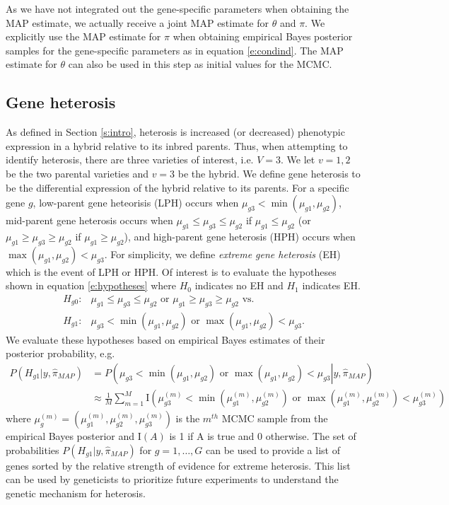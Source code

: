 \documentclass[useAMS,usenatbib,referee]{biom}
\begin{document}
As we have not integrated out the gene-specific parameters when obtaining the MAP estimate, we actually receive a joint MAP estimate for $\theta$ and $\pi$. We explicitly use the MAP estimate for $\pi$ when obtaining empirical Bayes posterior samples for the gene-specific parameters as in equation \eqref{e:condind}. The MAP estimate for $\theta$ can also be used in this step as initial values for the MCMC. 

\subsection{Gene heterosis}
\label{s:gene_heterosis}

As defined in Section \ref{s:intro}, heterosis is increased (or decreased) phenotypic expression in a hybrid relative to its inbred parents. Thus, when attempting to identify heterosis, there are three varieties of interest, i.e. $V=3$. We let $v=1,2$ be the two parental varieties and $v=3$ be the hybrid. We define gene heterosis to be the differential expression of the hybrid relative to its parents. For a specific gene $g$, low-parent gene heteorisis (LPH) occurs when $\mu_{g3}< \min(\mu_{g1},\mu_{g2})$, mid-parent gene heterosis occurs when $\mu_{g1}\le \mu_{g3}\le \mu_{g2}$ if $\mu_{g1}\le \mu_{g2}$ (or $\mu_{g1}\ge \mu_{g3}\ge \mu_{g2}$ if $\mu_{g1}\ge \mu_{g2}$), and high-parent gene heterosis (HPH) occurs when $\max(\mu_{g1},\mu_{g2}) < \mu_{g3}$. For simplicity, we define \emph{extreme gene heterosis} (EH) which is the event of LPH or HPH. Of interest is to evaluate the hypotheses shown in equation \eqref{e:hypotheses} where $H_0$ indicates no EH and $H_1$ indicates EH. 
\begin{align}
\label{e:hypotheses}
H_{g0}:&\mu_{g1}\le \mu_{g3}\le \mu_{g2} \mbox{ or } \mu_{g1}\ge \mu_{g3}\ge \mu_{g2} \mbox{\ \ vs.\ \ } \nonumber \\
H_{g1}:&\mu_{g3}< \min(\mu_{g1},\mu_{g2}) \mbox{ or } \max(\mu_{g1},\mu_{g2}) < \mu_{g3}.
\end{align}
We evaluate these hypotheses based on empirical Bayes estimates of their posterior probability, e.g. 
\begin{align}
P\left(H_{g1}|y, \hat{\pi}_{MAP}\right) &= P\left(\left.\mu_{g3}< \min(\mu_{g1},\mu_{g2}) \mbox{ or } \max(\mu_{g1},\mu_{g2}) < \mu_{g3}\right| y, \hat{\pi}_{MAP}\right) \nonumber \\
&\approx \frac{1}{M} \sum_{m=1}^M \mathrm{I}\left(\mu_{g3}^{(m)}< \min\left(\mu_{g1}^{(m)},\mu_{g2}^{(m)}\right) \mbox{ or } \max\left(\mu_{g1}^{(m)},\mu_{g2}^{(m)}\right) < \mu_{g3}^{(m)}\right) \label{e:probs}
\end{align}
where $\mu_g^{(m)} = \left(\mu_{g1}^{(m)},\mu_{g2}^{(m)},\mu_{g3}^{(m)}\right)$ is the $m^{th}$ MCMC sample from the empirical Bayes posterior and $\mathrm{I}(A)$ is 1 if A is true and 0 otherwise. The set of probabilities $P\left(H_{g1}|y, \hat{\pi}_{MAP}\right)$ for $g=1,\ldots,G$ can be used to provide a list of genes sorted by the relative strength of evidence for extreme heterosis. This list can be used by geneticists to prioritize future experiments to understand the genetic mechanism for heterosis.  
\end{document}
